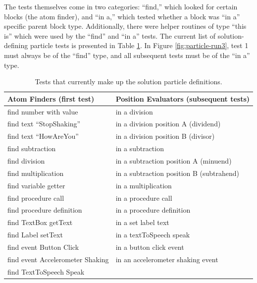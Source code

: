 The tests themselves come in two categories: ``find,'' which looked for certain blocks (the atom finder), and ``in a,'' which tested whether a block was ``in a'' specific parent block type. Additionally, there were helper routines of type ``this is'' which were used by the ``find'' and ``in a'' tests. The current list of solution-defining particle tests is presented in Table \ref{tab:particle-tests}. In Figure \ref{fig:particle-run3}, test 1 must always be of the ``find'' type, and all subsequent tests must be of the ``in a'' type. 

\begin{table}
\begin{centering}
	\begin{tabular}{l l}
		Atom Finders (first test)			& Position Evaluators (subsequent tests) \\ \hline
		find number with value  			& in a division \\
		find text ``StopShaking'' 			& in a division position A	(dividend)	\\
		find text ``HowAreYou'' 			& in a division position B	(divisor)	\\
		find subtraction 					& in a subtraction 	\\
		find division 						& in a subtraction position A (minuend)	\\
		find multiplication					& in a subtraction position B (subtrahend)	\\
		find variable getter 				& in a multiplication	\\
		find procedure call 				& in a procedure call	\\
		find procedure definition			& in a procedure definition	\\
		find TextBox getText 				& in a set label text 	\\
		find Label setText					& in a textToSpeech speak	\\
		find event Button Click				& in a button click event	\\
		find event Accelerometer Shaking	& in an accelerometer shaking event 	\\
		find TextToSpeech Speak				& 	\\

	\end{tabular}
	\caption[Particle solution tests]{Tests that currently make up the solution particle definitions.}
	\label{tab:particle-tests}
\end{centering}
\end{table}

